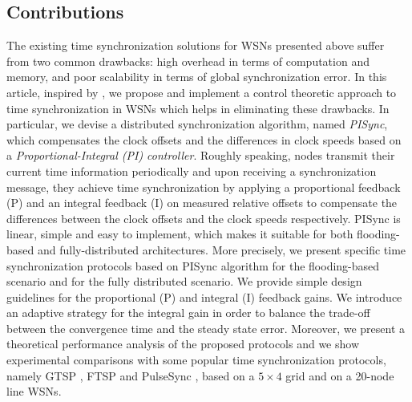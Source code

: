 \documentclass[english,a4paper,10pt,final]{article}
\numberwithin{equation}{section}
\numberwithin{figure}{section}
\begin{document}
 
\subsection{Contributions}

The existing time synchronization solutions for WSNs presented above suffer from two common drawbacks: high overhead in terms of computation and memory, and poor scalability in terms of global synchronization error. In this article, inspired by \cite{Carli_2011}, we propose and implement a control theoretic approach to time synchronization in WSNs which helps in eliminating these drawbacks.
In particular, we devise a distributed synchronization algorithm, named \textit{PISync}, which compensates the clock offsets and the differences in clock speeds based on a \textit{Proportional-Integral (PI) controller}. Roughly speaking,  nodes transmit their current time information periodically and upon receiving a synchronization message, they achieve time synchronization by applying a proportional feedback (P) and an integral feedback (I) on measured relative offsets  to compensate the differences between the clock offsets and the clock speeds respectively. PISync is linear, simple and easy to implement, which makes it suitable for both flooding-based and fully-distributed architectures. More precisely, we present specific time synchronization protocols based on PISync algorithm for the flooding-based scenario and for the fully distributed scenario. We provide simple design guidelines for the proportional (P)  and integral (I) feedback gains. We introduce an adaptive strategy for the integral gain in order to balance the trade-off between the convergence time and the steady state error. Moreover, we present a theoretical performance analysis of the proposed protocols and we show experimental comparisons with some popular time synchronization protocols, namely GTSP  \cite{Sommer2009Gradient}, FTSP \cite{Maroti2004} and PulseSync \cite{Lenzen2009Optimal}, based on a $5\times 4$ grid and on a 20-node line WSNs.
\end{document}
